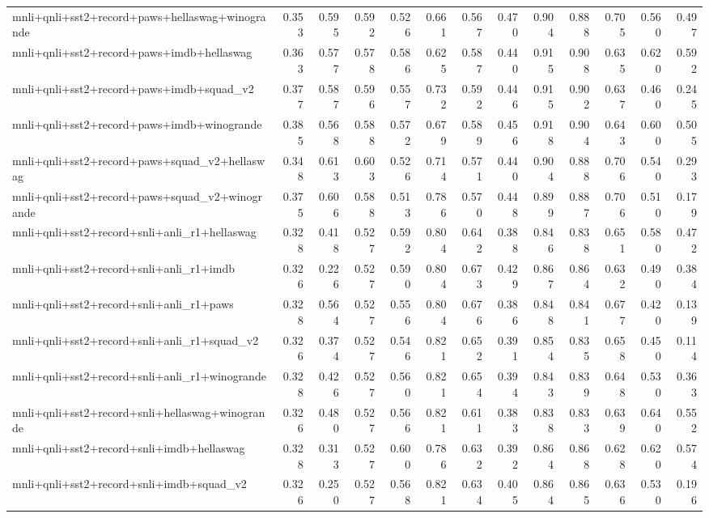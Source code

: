 \begin{table}[t]
\begin{tabular}{lrrrrrrrrrrrr}
    mnli+qnli+sst2+record+paws+hellaswag+winogrande & 0.353 & 0.595 & 0.592 & 0.526 & 0.661 & 0.567 & 0.470 & 0.904 & 0.888 & 0.705 & 0.560 & 0.497 \\
    mnli+qnli+sst2+record+paws+imdb+hellaswag & 0.363 & 0.577 & 0.578 & 0.586 & 0.625 & 0.587 & 0.440 & 0.915 & 0.908 & 0.635 & 0.620 & 0.592 \\
    mnli+qnli+sst2+record+paws+imdb+squad\_v2 & 0.377 & 0.587 & 0.596 & 0.557 & 0.732 & 0.592 & 0.446 & 0.915 & 0.902 & 0.637 & 0.460 & 0.245 \\
    mnli+qnli+sst2+record+paws+imdb+winogrande & 0.385 & 0.568 & 0.588 & 0.572 & 0.679 & 0.589 & 0.456 & 0.918 & 0.904 & 0.643 & 0.600 & 0.505 \\
    mnli+qnli+sst2+record+paws+squad\_v2+hellaswag & 0.348 & 0.613 & 0.603 & 0.526 & 0.714 & 0.571 & 0.440 & 0.904 & 0.888 & 0.706 & 0.540 & 0.293 \\
    mnli+qnli+sst2+record+paws+squad\_v2+winogrande & 0.375 & 0.606 & 0.588 & 0.513 & 0.786 & 0.570 & 0.448 & 0.899 & 0.887 & 0.706 & 0.510 & 0.179 \\
    mnli+qnli+sst2+record+snli+anli\_r1+hellaswag & 0.328 & 0.418 & 0.527 & 0.592 & 0.804 & 0.642 & 0.388 & 0.846 & 0.838 & 0.651 & 0.580 & 0.472 \\
    mnli+qnli+sst2+record+snli+anli\_r1+imdb & 0.326 & 0.226 & 0.527 & 0.590 & 0.804 & 0.673 & 0.429 & 0.867 & 0.864 & 0.632 & 0.490 & 0.384 \\
    mnli+qnli+sst2+record+snli+anli\_r1+paws & 0.328 & 0.564 & 0.527 & 0.556 & 0.804 & 0.676 & 0.386 & 0.848 & 0.841 & 0.677 & 0.420 & 0.139 \\
    mnli+qnli+sst2+record+snli+anli\_r1+squad\_v2 & 0.326 & 0.374 & 0.527 & 0.546 & 0.821 & 0.652 & 0.391 & 0.854 & 0.835 & 0.658 & 0.450 & 0.114 \\
    mnli+qnli+sst2+record+snli+anli\_r1+winogrande & 0.328 & 0.426 & 0.527 & 0.560 & 0.821 & 0.654 & 0.394 & 0.843 & 0.839 & 0.648 & 0.530 & 0.363 \\
    mnli+qnli+sst2+record+snli+hellaswag+winogrande & 0.326 & 0.480 & 0.527 & 0.566 & 0.821 & 0.611 & 0.383 & 0.838 & 0.833 & 0.639 & 0.640 & 0.552 \\
    mnli+qnli+sst2+record+snli+imdb+hellaswag & 0.328 & 0.313 & 0.527 & 0.600 & 0.786 & 0.632 & 0.392 & 0.864 & 0.868 & 0.628 & 0.620 & 0.574 \\
    mnli+qnli+sst2+record+snli+imdb+squad\_v2 & 0.326 & 0.250 & 0.527 & 0.568 & 0.821 & 0.634 & 0.405 & 0.864 & 0.865 & 0.636 & 0.530 & 0.196 \\

\end{tabular}
\end{table}

